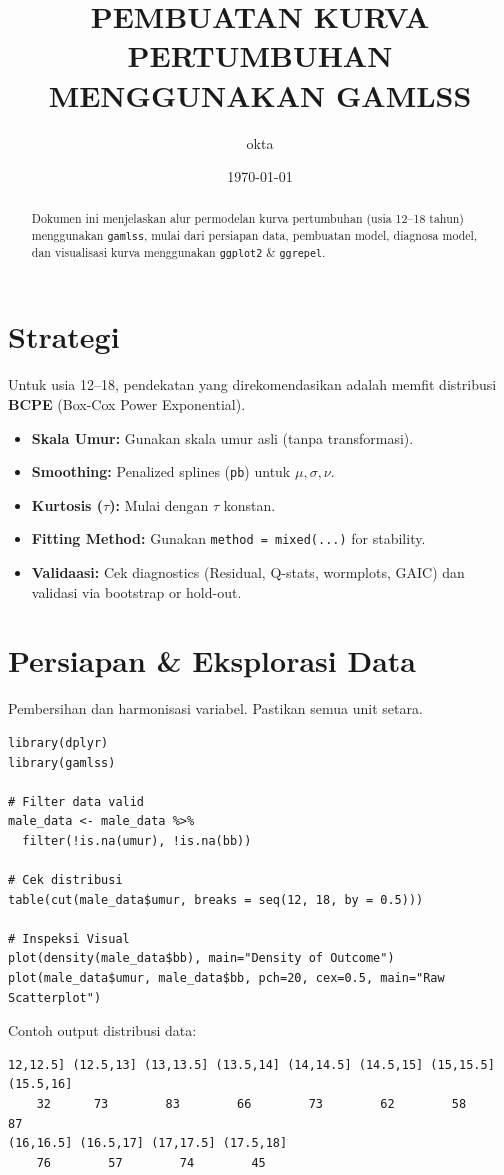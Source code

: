 \documentclass[11pt, a4paper]{article}
\title{\textbf{PEMBUATAN KURVA PERTUMBUHAN MENGGUNAKAN GAMLSS}}
\author{okta}
\date{\today}
\begin{document}
\maketitle

\begin{abstract}
\noindent 
Dokumen ini menjelaskan alur permodelan kurva pertumbuhan (usia 12--18 tahun) menggunakan \texttt{gamlss}, mulai dari persiapan data, pembuatan model, diagnosa model, dan visualisasi kurva menggunakan \texttt{ggplot2} \& \texttt{ggrepel}.
\end{abstract}

\tableofcontents
\newpage

\section{Strategi}
Untuk usia 12--18, pendekatan yang direkomendasikan adalah memfit distribusi \textbf{BCPE} (Box-Cox Power Exponential). 
\begin{itemize}
    \item \textbf{Skala Umur:} Gunakan skala umur asli (tanpa transformasi).
    \item \textbf{Smoothing:} Penalized splines (\texttt{pb}) untuk $\mu, \sigma, \nu$.
    \item \textbf{Kurtosis ($\tau$):} Mulai dengan $\tau$ konstan.
    \item \textbf{Fitting Method:} Gunakan \texttt{method = mixed(...)} for stability.
    \item \textbf{Validaasi:} Cek diagnostics (Residual, Q-stats, wormplots, GAIC) dan validasi via bootstrap or hold-out.
\end{itemize}

\section{Persiapan \& Eksplorasi Data}
Pembersihan dan harmonisasi variabel. Pastikan semua unit setara.

\begin{lstlisting}
library(dplyr)
library(gamlss)

# Filter data valid
male_data <- male_data %>% 
  filter(!is.na(umur), !is.na(bb))

# Cek distribusi 
table(cut(male_data$umur, breaks = seq(12, 18, by = 0.5)))

# Inspeksi Visual
plot(density(male_data$bb), main="Density of Outcome")
plot(male_data$umur, male_data$bb, pch=20, cex=0.5, main="Raw Scatterplot")
\end{lstlisting}
\noindent
Contoh output distribusi data: 
\begin{Verbatim}[frame=single]
12,12.5] (12.5,13] (13,13.5] (13.5,14] (14,14.5] (14.5,15] (15,15.5] (15.5,16] 
    32      73        83        66        73        62        58        87 
(16,16.5] (16.5,17] (17,17.5] (17.5,18] 
    76        57        74        45 
\end{Verbatim}
\end{document}
